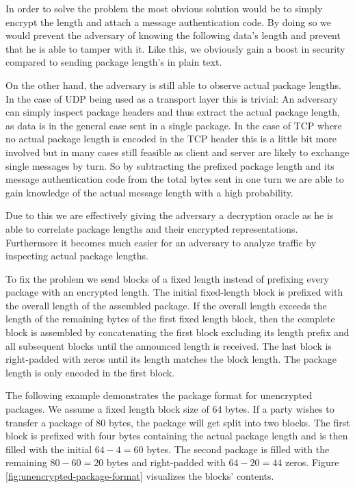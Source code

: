 In order to solve the problem the most obvious solution would be to simply encrypt the length and attach a message authentication code.
By doing so we would prevent the adversary of knowing the following data's length and prevent that he is able to tamper with it.
Like this, we obviously gain a boost in security compared to sending package length's in plain text.

On the other hand, the adversary is still able to observe actual package lengths.
In the case of UDP being used as a transport layer this is trivial:
An adversary can simply inspect package headers and thus extract the actual package length, as data is in the general case sent in a single package.
In the case of TCP where no actual package length is encoded in the TCP header this is a little bit more involved but in many cases still feasible as client and server are likely to exchange single messages by turn.
So by subtracting the prefixed package length and its message authentication code from the total bytes sent in one turn we are able to gain knowledge of the actual message length with a high probability.

Due to this we are effectively giving the adversary a decryption oracle as he is able to correlate package lengths and their encrypted representations.
Furthermore it becomes much easier for an adversary to analyze traffic by inspecting actual package lengths.

To fix the problem we send blocks of a fixed length instead of prefixing every package with an encrypted length.
The initial fixed-length block is prefixed with the overall length of the assembled package.
If the overall length exceeds the length of the remaining bytes of the first fixed length block, then the complete block is assembled by concatenating the first block excluding its length prefix and all subsequent blocks until the announced length is received.
The last block is right-padded with zeros until its length matches the block length.
The package length is only encoded in the first block.

The following example demonstrates the package format for unencrypted packages.
We assume a fixed length block size of 64 bytes.
If a party wishes to transfer a package of 80 bytes, the package will get split into two blocks.
The first block is prefixed with four bytes containing the actual package length and is then filled with the initial $64 - 4 = 60$ bytes.
The second package is filled with the remaining $80 - 60 = 20$ bytes and right-padded with $64 - 20 = 44$ zeros.
Figure \ref{fig:unencrypted-package-format} visualizes the blocks' contents.

